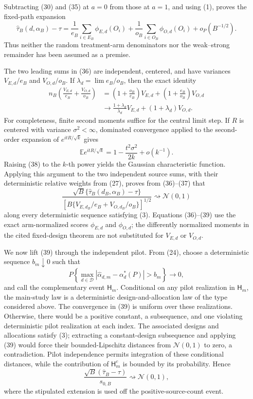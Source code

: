 Subtracting (30) and (35) at \(a=0\) from those at \(a=1\), and using (1), proves the fixed-path expansion
\[
 \widehat\tau_B(d,\alpha_B)-\tau
 =\frac1{e_B}\sum_{i\in E_B}\phi_{E,d}(O_i)
  +\frac1{o_B}\sum_{i\in O_B}\phi_{O,d}(O_i)
  +o_P(B^{-1/2}).                                           \tag{36}
\]
Thus neither the random treatment-arm denominators nor the weak--strong remainder has been assumed as a premise.

The two leading sums in (36) are independent, centered, and have variances \(V_{E,d}/e_B\) and \(V_{O,d}/o_B\).  If \(\lambda_d=\lim e_B/o_B\), then the exact identity
\[
\begin{aligned}
 n_B\left(\frac{V_{E,d}}{e_B}+\frac{V_{O,d}}{o_B}\right)
 &=\left(1+\frac{o_B}{e_B}\right)V_{E,d}
  +\left(1+\frac{e_B}{o_B}\right)V_{O,d}\\
 &\longrightarrow
 \frac{1+\lambda_d}{\lambda_d}V_{E,d}
 +(1+\lambda_d)V_{O,d}.
\end{aligned}                                                \tag{37}
\]
For completeness, finite second moments suffice for the central limit step.  If \(R\) is centered with variance \(\sigma^2<\infty\), dominated convergence applied to the second-order expansion of \(e^{itR/\sqrt{k}}\) gives
\[
 \mathbb E e^{itR/\sqrt{k}}
 =1-\frac{t^2\sigma^2}{2k}+o(k^{-1}).                      \tag{38}
\]
Raising (38) to the \(k\)-th power yields the Gaussian characteristic function.  Applying this argument to the two independent source sums, with their deterministic relative weights from (27), proves from (36)--(37) that
\[
 \frac{\sqrt B\{\widehat\tau_B(d_B,\alpha_B)-\tau\}}
 {\left[B\{V_{E,d_B}/e_B+V_{O,d_B}/o_B\}\right]^{1/2}}
 \rightsquigarrow\mathcal N(0,1)                           \tag{39}
\]
along every deterministic sequence satisfying (3).  Equations (36)--(39) use the exact arm-normalized scores \(\phi_{E,d}\) and \(\phi_{O,d}\); the differently normalized moments in the cited fixed-design theorem are not substituted for \(V_{E,d}\) or \(V_{O,d}\).

We now lift (39) through the independent pilot.  From (24), choose a deterministic sequence \(b_m\downarrow0\) such that
\[
 P\left\{\max_{d\in\mathcal D}
 |\widehat\alpha_{d,m}-\alpha_d^*(P)|>b_m\right\}
 \longrightarrow0,                                        \tag{40}
\]
and call the complementary event \(\mathsf H_m\).  Conditional on any pilot realization in \(\mathsf H_m\), the main-study law is a deterministic design-and-allocation law of the type considered above.  The convergence in (39) is uniform over these realizations.  Otherwise, there would be a positive constant, a subsequence, and one violating deterministic pilot realization at each index.  The associated designs and allocations satisfy (3); extracting a constant-design subsequence and applying (39) would force their bounded-Lipschitz distances from \(\mathcal N(0,1)\) to zero, a contradiction.  Pilot independence permits integration of these conditional distances, while the contribution of \(\mathsf H_m^c\) is bounded by its probability.  Hence
\[
 \frac{\sqrt B(\widehat\tau_B-\tau)}{s_{0,B}}
 \rightsquigarrow\mathcal N(0,1),                          \tag{41}
\]
where the stipulated extension is used off the positive-source-count event.


